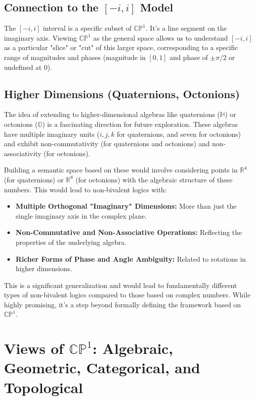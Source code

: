	\subsection{Connection to the $[-i, i]$ Model}
	
	The $[-i, i]$ interval is a specific subset of $\mathbb{CP}^1$. It's a line segment on the imaginary axis. Viewing $\mathbb{CP}^1$ as the general space allows us to understand $[-i, i]$ as a particular "slice" or "cut" of this larger space, corresponding to a specific range of magnitudes and phases (magnitude in $[0, 1]$ and phase of $\pm\pi/2$ or undefined at 0).
	
	\subsection{Higher Dimensions (Quaternions, Octonions)}
	
	The idea of extending to higher-dimensional algebras like quaternions ($\mathbb{H}$) or octonions ($\mathbb{O}$) is a fascinating direction for future exploration. These algebras have multiple imaginary units ($i, j, k$ for quaternions, and seven for octonions) and exhibit non-commutativity (for quaternions and octonions) and non-associativity (for octonions).
	
	Building a semantic space based on these would involve considering points in $\mathbb{R}^4$ (for quaternions) or $\mathbb{R}^8$ (for octonions) with the algebraic structure of these numbers. This would lead to non-bivalent logics with:
	
	\begin{itemize}
		\item \textbf{Multiple Orthogonal "Imaginary" Dimensions:} More than just the single imaginary axis in the complex plane.
		
		\item \textbf{Non-Commutative and Non-Associative Operations:} Reflecting the properties of the underlying algebra.
		
		\item \textbf{Richer Forms of Phase and Angle Ambiguity:} Related to rotations in higher dimensions.
	\end{itemize}
	This is a significant generalization and would lead to fundamentally different types of non-bivalent logics compared to those based on complex numbers. While highly promising, it's a step beyond formally defining the framework based on $\mathbb{CP}^1$.
	
	\section{Views of $\mathbb{CP}^1$: Algebraic, Geometric, Categorical, and Topological}
	
